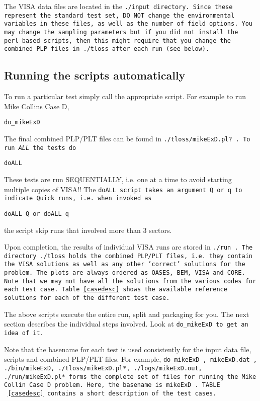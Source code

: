 The VISA data files are located in the \tt ./input \rm directory. 
Since these represent the standard test set, DO NOT change 
the environmental variables in these files, as well as the 
number of field options. You may change the sampling parameters 
but if you did not install the perl-based scripts, then this 
might require that you change the combined PLP files in \tt ./tloss \rm
after each run (see below).

\subsection{Running the scripts automatically}
To run a particular test simply call the appropriate script. 
For example to run Mike Collins Case D, 

\tt do\_mikeExD \rm

\noindent The final combined PLP/PLT files can be found in 
\tt ./tloss/mikeExD.pl? \rm. To run {\em ALL} the tests do

\tt doALL \rm

\noindent These tests are run SEQUENTIALLY, i.e. one at a time to 
avoid starting multiple copies of VISA!! The \tt doALL \rm script
takes an argument \tt Q \rm or \tt q \rm to indicate \tt Quick \rm
runs, i.e. when invoked as

\tt doALL Q \rm or \tt doALL q \rm

\noindent the script skip runs that involved more than 3 sectors.


Upon completion, the results of individual VISA runs are stored in
\tt ./run \rm. The directory \tt ./tloss \rm holds the combined
PLP/PLT files, i.e. they contain the VISA solutions as well as any
other 'correct' solutions for the problem. The plots are always 
ordered as OASES, BEM, VISA and CORE. Note that we may not have
all the solutions from the various codes for each test case. 
Table~\ref{casedesc} shows the available reference solutions for
each of the different test case.

 The above scripts execute the entire run, split and packaging 
 for you. The next section describes the individual steps involved. 
 Look at \tt do\_mikeExD \rm to get an idea of it.

 Note that the basename for each test is used consistently for the 
 input data file, scripts and combined PLP/PLT files. For example,
 \tt do\_mikeExD \rm, \tt mikeExD.dat \rm, \tt ./bin/mikeExD\rm, 
 \tt ./tloss/mikeExD.pl*\rm, \tt ./logs/mikeExD.out\rm, 
 \tt ./run/mikeExD.pl* \rm
 forms the complete set of files for running the Mike Collin
 Case D problem. Here, the basename is \tt mikeExD \rm.
 TABLE ~\ref{casedesc} contains a short description of the test 
 cases.

